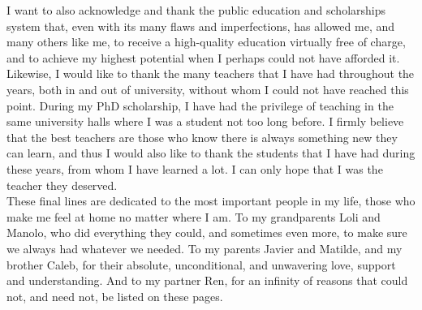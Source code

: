 {I want to also acknowledge and thank the public education and scholarships system that, even with its many flaws and imperfections, has allowed me, and many others like me, to receive a high-quality education virtually free of charge, and to achieve my highest potential when I perhaps could not have afforded it. Likewise, I would like to thank the many teachers that I have had throughout the years, both in and out of university, without whom I could not have reached this point. During my PhD scholarship, I have had the privilege of teaching in the same university halls where I was a student not too long before. I firmly believe that the best teachers are those who know there is always something new they can learn, and thus I would also like to thank the students that I have had during these years, from whom I have learned a lot. I can only hope that I was the teacher they deserved.\\

These final lines are dedicated to the most important people in my life, those who make me feel at home no matter where I am. To my grandparents Loli and Manolo, who did everything they could, and sometimes even more, to make sure we always had whatever we needed. To my parents Javier and Matilde, and my brother Caleb, for their absolute, unconditional, and unwavering love, support and understanding. And to my partner Ren, for an infinity of reasons that could not, and need not, be listed on these pages.
}
